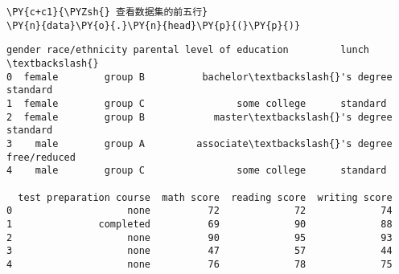     \begin{tcolorbox}[breakable, size=fbox, boxrule=1pt, pad at break*=1mm,colback=cellbackground, colframe=cellborder]
\begin{Verbatim}[commandchars=\\\{\}]
\PY{c+c1}{\PYZsh{} 查看数据集的前五行}
\PY{n}{data}\PY{o}{.}\PY{n}{head}\PY{p}{(}\PY{p}{)}
\end{Verbatim}
\end{tcolorbox}

            \begin{tcolorbox}[breakable, size=fbox, boxrule=.5pt, pad at break*=1mm, opacityfill=0]
\begin{Verbatim}[commandchars=\\\{\}]
   gender race/ethnicity parental level of education         lunch  \textbackslash{}
0  female        group B          bachelor\textbackslash{}'s degree      standard
1  female        group C                some college      standard
2  female        group B            master\textbackslash{}'s degree      standard
3    male        group A         associate\textbackslash{}'s degree  free/reduced
4    male        group C                some college      standard

  test preparation course  math score  reading score  writing score
0                    none          72             72             74
1               completed          69             90             88
2                    none          90             95             93
3                    none          47             57             44
4                    none          76             78             75
\end{Verbatim}
\end{tcolorbox}
        
